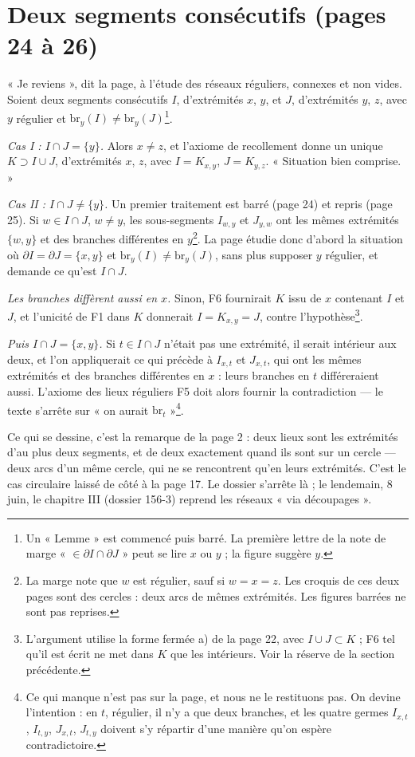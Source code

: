 \documentclass[11pt,a4paper]{article}
\begin{document}
\section*{Deux segments consécutifs (pages 24 à 26)}

« Je reviens », dit la page, à l'étude des réseaux réguliers, connexes et non
vides. Soient deux segments consécutifs $I$, d'extrémités $x$, $y$, et $J$,
d'extrémités $y$, $z$, avec $y$ régulier et $\mathrm{br}_{y}(I) \neq
\mathrm{br}_{y}(J)$\footnote{Un « Lemme » est commencé puis barré. La
première lettre de la note de marge « $\in \partial I \cap \partial J$ » peut
se lire $x$ ou $y$ ; la figure suggère $y$.}.

\emph{Cas I : $I \cap J = \{y\}$.} Alors $x \neq z$, et l'axiome de
recollement donne un unique $K \supset I \cup J$, d'extrémités $x$, $z$, avec
$I = K_{x,y}$, $J = K_{y,z}$. « Situation bien comprise. »

\emph{Cas II : $I \cap J \neq \{y\}$.} Un premier traitement est barré (page
24) et repris (page 25). Si $w \in I \cap J$, $w \neq y$, les sous-segments
$I_{w,y}$ et $J_{y,w}$ ont les mêmes extrémités $\{w,y\}$ et des branches
différentes en $y$\footnote{La marge note que $w$ est régulier, sauf si $w =
x = z$. Les croquis de ces deux pages sont des cercles : deux arcs de mêmes
extrémités. Les figures barrées ne sont pas reprises.}. La page étudie donc
d'abord la situation où $\partial I = \partial J = \{x,y\}$ et
$\mathrm{br}_{y}(I) \neq \mathrm{br}_{y}(J)$, sans plus supposer $y$ régulier,
et demande ce qu'est $I \cap J$.

\emph{Les branches diffèrent aussi en $x$.} Sinon, F6 fournirait $K$ issu de
$x$ contenant $I$ et $J$, et l'unicité de F1 dans $K$ donnerait $I = K_{x,y} =
J$, contre l'hypothèse\footnote{L'argument utilise la forme fermée a) de la
page 22, avec $I \cup J \subset K$ ; F6 tel qu'il est écrit ne met dans $K$
que les intérieurs. Voir la réserve de la section précédente.}.

\emph{Puis $I \cap J = \{x,y\}$.} Si $t \in I \cap J$ n'était pas une
extrémité, il serait intérieur aux deux, et l'on appliquerait ce qui précède
à $I_{x,t}$ et $J_{x,t}$, qui ont les mêmes extrémités et des branches
différentes en $x$ : leurs branches en $t$ différeraient aussi. L'axiome des
lieux réguliers F5 doit alors fournir la contradiction --- le texte s'arrête
sur « on aurait $\mathrm{br}_{t}$ »\footnote{Ce qui manque n'est pas sur la
page, et nous ne le restituons pas. On devine l'intention : en $t$, régulier,
il n'y a que deux branches, et les quatre germes $I_{x,t}$, $I_{t,y}$,
$J_{x,t}$, $J_{t,y}$ doivent s'y répartir d'une manière qu'on espère
contradictoire.}.

Ce qui se dessine, c'est la remarque de la page 2 : deux lieux sont les
extrémités d'au plus deux segments, et de deux exactement quand ils sont sur
un cercle --- deux arcs d'un même cercle, qui ne se rencontrent qu'en leurs
extrémités. C'est le cas circulaire laissé de côté à la page 17. Le dossier
s'arrête là ; le lendemain, 8 juin, le chapitre III (dossier 156-3) reprend
les réseaux « via découpages ».
\end{document}
